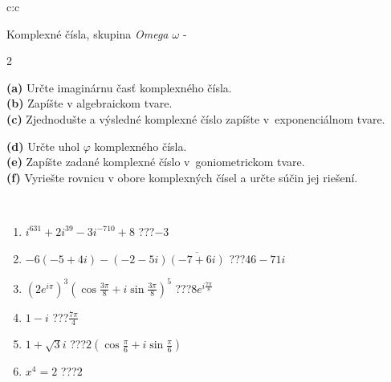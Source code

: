 \documentclass[10pt]{report}
\begin{document}
\begin{tabular}{c:c}
\begin{minipage}[c][104.5mm][t]{0.5\linewidth}
\begin{center}
\vspace{7mm}
{\huge Komplexné čísla, skupina \textit{Omega $\omega$} -}\\[5mm]
\begin{minipage}{0.95\linewidth}
\begin{center}
{\small \begin{multicols}{2} \raggedright
\textbf{(a)} Určte imaginárnu časť komplexného čísla. \\[1mm]
\textbf{(b)} Zapíšte v algebraickom tvare. \\[1mm]
\textbf{(c)} Zjednodušte a výsledné komplexné číslo zapíšte v~exponenciálnom tvare. \par \columnbreak
\textbf{(d)} Určte uhol \(\varphi\) komplexného čísla. \\[1mm]
\textbf{(e)} Zapíšte zadané komplexné číslo v~goniometrickom tvare. \\[1mm]
\textbf{(f)} Vyriešte rovnicu v obore komplexných čísel a určte súčin jej riešení.
\end{multicols}
}
\end{center}
\end{minipage}
\\[4mm]
\begin{minipage}{0.79\linewidth}
\begin{center}
\begin{varwidth}{\linewidth}
\begin{enumerate}
\large
\item $i^{631}+2i^{39}-3i^{-710}+8$\quad \dotfill\; ???\;\dotfill \quad $-3$
\item $-6(-5+4i)-(-2-5i)\overline{(-7+6i)}$\quad \dotfill\; ???\;\dotfill \quad $46-71i$
\item $\left(2e^{i\pi}\right)^{3}\left(\cos{\frac{3\pi}{8}}+i\sin{\frac{3\pi}{8}}\right)^{5}$\quad \dotfill\; ???\;\dotfill \quad $8e^{i\frac{7\pi}{8}}$
\item $1-i$\quad \dotfill\; ???\;\dotfill \quad $\frac{7\pi}{4}$
\item $1+\sqrt{3}i$\quad \dotfill\; ???\;\dotfill \quad $2\left(\cos{\frac{\pi}{6}}+i\sin{\frac{\pi}{6}}\right)$
\item $x^4=2$\quad \dotfill\; ???\;\dotfill \quad $2$
\end{enumerate}
\end{varwidth}

\end{center}
\end{minipage}
\end{center}
\end{minipage}
\end{tabular}
\end{document}
